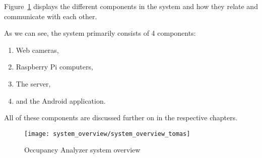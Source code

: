 Figure~\ref{fig:system_overview} displays the different components in the system and how they relate and communicate with each other.

As we can see, the system primarily consists of 4 components:

\begin{enumerate}
	\item Web cameras,
	\item Raspberry Pi computers,
	\item The server,
	\item and the Android application.
\end{enumerate}

All of these components are discussed further on in the respective chapters.
\begin{figure}[htb]
	\centering
	\texttt{[image: system\_overview/system\_overview\_tomas]}
	\caption{Occupancy Analyzer system overview}
	\label{fig:system_overview}
\end{figure}